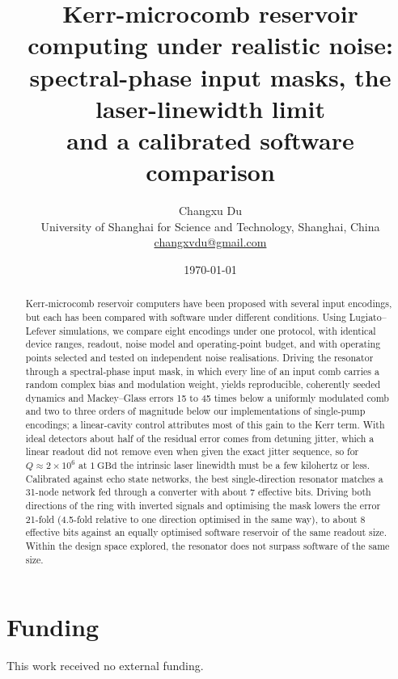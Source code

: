 \documentclass[11pt,a4paper]{article}
\title{Kerr-microcomb reservoir computing under realistic noise:\\spectral-phase input masks, the laser-linewidth limit\\and a calibrated software comparison}
\author{Changxu Du\\[2pt]
\small University of Shanghai for Science and Technology, Shanghai, China\\
\small \href{mailto:changxvdu@gmail.com}{changxvdu@gmail.com}}
\date{\today}
\begin{document}
\maketitle

\begin{abstract}
Kerr-microcomb reservoir computers have been proposed with several input encodings, but each has been compared with software under
different conditions. Using Lugiato--Lefever simulations, we compare eight encodings under one protocol, with identical device
ranges, readout, noise model and operating-point budget, and with operating points selected and tested on independent noise
realisations. Driving the resonator through a spectral-phase input mask, in which every line of an input comb carries a random
complex bias and modulation weight, yields reproducible, coherently seeded dynamics and Mackey--Glass errors 15 to 45 times below a
uniformly modulated comb and two to three orders of magnitude below our implementations of single-pump encodings; a linear-cavity
control attributes most of this gain to the Kerr term. With ideal detectors about half of the residual error comes from detuning
jitter, which a linear readout did not remove even when given the exact jitter sequence, so for $Q\approx2\times10^{6}$ at
$1~\mathrm{GBd}$ the intrinsic laser linewidth must be a few kilohertz or less. Calibrated against echo state networks, the best
single-direction resonator matches a 31-node network fed through a converter with about 7 effective bits. Driving both directions of
the ring with inverted signals and optimising the mask lowers the error 21-fold (4.5-fold relative to one direction optimised in the
same way), to about 8 effective bits against an equally optimised software reservoir of the same readout size. Within the design
space explored, the resonator does not surpass software of the same size.
\end{abstract}













\appendix


\section*{Funding}
This work received no external funding.
\end{document}
